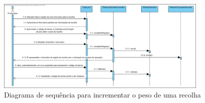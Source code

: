 \begin{figure}[h!] 
	\begin{center}
		\includegraphics[width=0.90\textwidth,keepaspectratio]{figuras/Diagramas_vp/SD_Fabrica_7_Completar_Recolha.jpg}
		\caption{Diagrama de sequência para incrementar o peso de uma recolha}
		\label{fig:sd_completar_recolha} 
	\end{center}
\end{figure}